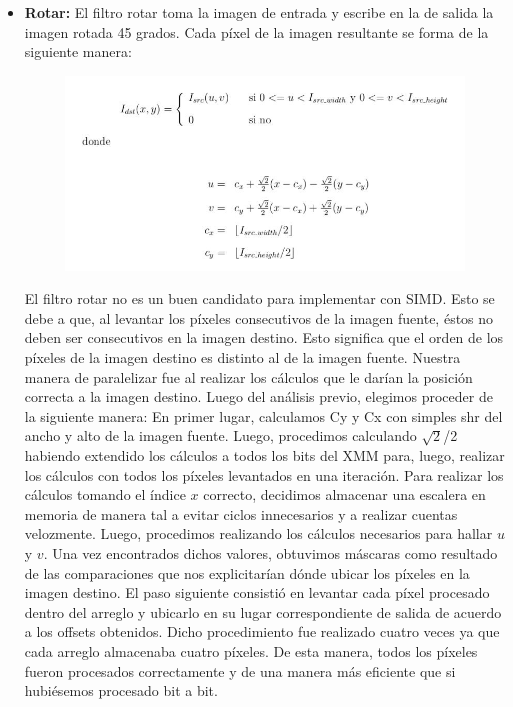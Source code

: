 \documentclass[10pt, a4paper]{article}
\begin{document}
\begin{itemize}
\item {\textbf{Rotar:}} 
El filtro rotar toma la imagen de entrada y escribe en la de salida la imagen rotada 45 grados. Cada píxel de la imagen resultante se forma de la siguiente manera:
\begin{figure}[H] %
\begin{center}
\includegraphics[width=400pt]{./rotar.jpg}
\end{center}
\end{figure}
El filtro rotar no es un buen candidato para implementar con SIMD. Esto se debe a que, al levantar los píxeles consecutivos de la imagen fuente, éstos no deben ser consecutivos en la imagen destino. Esto significa que el orden de los píxeles de la imagen destino es distinto al de la imagen fuente. Nuestra manera de paralelizar fue al realizar los cálculos que le darían la posición correcta a la imagen destino.\newline
Luego del análisis previo, elegimos proceder de la siguiente manera:\newline
En primer lugar, calculamos Cy y Cx con simples shr del ancho y alto de la imagen fuente. Luego, procedimos calculando $\sqrt{2}$/2 habiendo extendido los cálculos a todos los bits del XMM para, luego, realizar los cálculos con todos los píxeles levantados en una iteración.\newline
Para realizar los cálculos tomando el índice $x$ correcto, decidimos almacenar una escalera en memoria de manera tal a evitar ciclos innecesarios y a realizar cuentas velozmente.\newline
Luego, procedimos realizando los cálculos necesarios para hallar $u$ y $v$. Una vez encontrados dichos valores, obtuvimos máscaras como resultado de las comparaciones que nos explicitarían dónde ubicar los píxeles en la imagen destino.\newline
El paso siguiente consistió en levantar cada píxel procesado dentro del arreglo y ubicarlo en su lugar correspondiente de salida de acuerdo a los offsets obtenidos. Dicho procedimiento fue realizado cuatro veces ya que cada arreglo almacenaba cuatro píxeles. De esta manera, todos los píxeles fueron procesados correctamente y de una manera más eficiente que si hubiésemos procesado bit a bit.\newline

\end{itemize}
\end{document}

